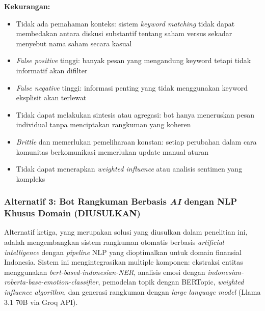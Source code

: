 \textbf{Kekurangan:}
\begin{itemize}
\item Tidak ada pemahaman konteks: sistem \textit{keyword matching} tidak dapat membedakan antara diskusi substantif tentang saham versus sekadar menyebut nama saham secara kasual
\item \textit{False positive} tinggi: banyak pesan yang mengandung keyword tetapi tidak informatif akan difilter
\item \textit{False negative} tinggi: informasi penting yang tidak menggunakan keyword eksplisit akan terlewat
\item Tidak dapat melakukan sintesis atau agregasi: bot hanya meneruskan pesan individual tanpa menciptakan rangkuman yang koheren
\item \textit{Brittle} dan memerlukan pemeliharaan konstan: setiap perubahan dalam cara komunitas berkomunikasi memerlukan update manual aturan
\item Tidak dapat menerapkan \textit{weighted influence} atau analisis sentimen yang kompleks
\end{itemize}

\subsubsection{Alternatif 3: Bot Rangkuman Berbasis \textit{AI} dengan NLP Khusus Domain (DIUSULKAN)}

Alternatif ketiga, yang merupakan solusi yang diusulkan dalam penelitian ini, adalah mengembangkan sistem rangkuman otomatis berbasis \textit{artificial intelligence} dengan \textit{pipeline} NLP yang dioptimalkan untuk domain finansial Indonesia. Sistem ini mengintegrasikan multiple komponen: ekstraksi entitas menggunakan \textit{bert-based-indonesian-NER}, analisis emosi dengan \textit{indonesian-roberta-base-emotion-classifier}, pemodelan topik dengan BERTopic, \textit{weighted influence algorithm}, dan generasi rangkuman dengan \textit{large language model} (Llama 3.1 70B via Groq API).

